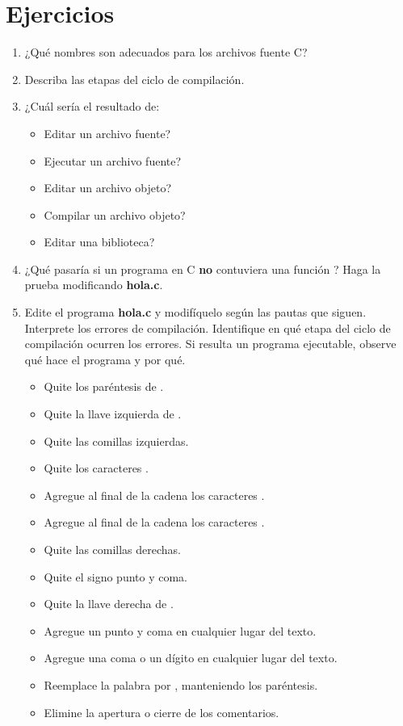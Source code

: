 \section{Ejercicios}
\begin{enumerate}
	\item ¿Qué nombres son adecuados para los archivos fuente C? 
	\item Describa las etapas del ciclo de compilación.
	\item ¿Cuál sería el resultado de: 
		\begin{itemize}
		\item Editar un archivo fuente? 
		\item Ejecutar un archivo fuente? 
		\item Editar un archivo objeto? 
		\item Compilar un archivo objeto? 
		\item Editar una biblioteca?
		\end{itemize}
	\item ¿Qué pasaría si un programa en C \textbf{no} contuviera una función ? Haga la prueba modificando \textbf{hola.c}.
	\item Edite el programa \textbf{hola.c} y modifíquelo según las pautas que siguen. Interprete los errores de compilación. Identifique en qué etapa del ciclo de compilación ocurren los errores. Si resulta un programa ejecutable, observe qué hace el programa y por qué. 
		\begin{itemize}
		\item Quite los paréntesis de . 
		\item Quite la llave izquierda de .
		\item Quite las comillas izquierdas.
		\item Quite los caracteres \quotes{\code{\\n}}.
		\item Agregue al final de la cadena los caracteres \quotes{\code{\\n\\n\\n\\n}}.
		\item Agregue al final de la cadena los caracteres .
		\item Quite las comillas derechas.
		\item Quite el signo punto y coma. 
		\item Quite la llave derecha de .
		\item Agregue un punto y coma en cualquier lugar del texto.
		\item Agregue una coma o un dígito en cualquier lugar del texto. 
		\item Reemplace la palabra  por , manteniendo los paréntesis. 
		\item Elimine la apertura o cierre de los comentarios.
		\end{itemize}
\end{enumerate}

